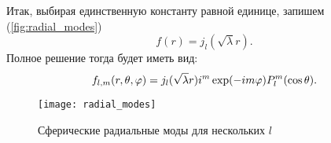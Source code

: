 \documentclass[12pt,a4paper]{article}
\begin{document}
        Итак, выбирая единственную константу равной единице, запишем (\autoref{fig:radial_modes})
        \begin{equation}
            f(r) = j_l(\sqrt{\lambda} r) .
        \end{equation}
        Полное решение тогда будет иметь вид:
        \begin{equation}
            f_{l,m}(r,\theta,\varphi)
                = j_l(\sqrt{\lambda} r) i^m \exp(- i m \varphi) P^m_l\qty(\cos\theta) .
        \end{equation}
        \begin{figure}[h]
            \centering
            \texttt{[image: radial\_modes]}
            \caption[]{Сферические радиальные моды для нескольких $l$}
            \label{fig:radial_modes}
        \end{figure}


    \nocite{*}
    
    
\end{document}
